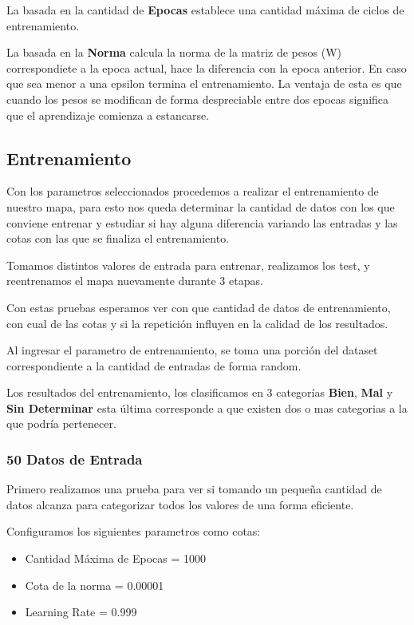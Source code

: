 La basada en la cantidad de \textbf{Epocas} establece una cantidad máxima de
ciclos de entrenamiento.

La basada en la \textbf{Norma} calcula la norma de la matriz de pesos (W) 
correspondiete a la epoca actual, hace la diferencia con la epoca anterior.
En caso que sea menor a una epsilon termina el entrenamiento. La ventaja
de esta es que cuando los pesos se modifican de forma despreciable entre
dos epocas significa que el aprendizaje comienza a estancarse.


\subsection{Entrenamiento}

Con los parametros seleccionados procedemos a realizar el entrenamiento de
nuestro mapa, para esto nos queda determinar la cantidad de datos con los que
conviene entrenar y estudiar si hay alguna diferencia variando las entradas
y las cotas con las que se finaliza el entrenamiento.

Tomamos distintos valores de entrada para entrenar, realizamos los test, y
reentrenamos el mapa nuevamente durante 3 etapas.

Con estas pruebas esperamos ver con que cantidad de datos de entrenamiento, 
con cual de las cotas y si la repetición influyen en la calidad de los resultados.

Al ingresar el parametro de entrenamiento, se toma una porción del dataset correspondiente
a la cantidad de entradas de forma random.

Los resultados del entrenamiento, los clasificamos en 3 categorías \textbf{Bien}, \textbf{Mal}
y \textbf{Sin Determinar} esta última corresponde a que existen dos o mas categorias a la que
podría pertenecer.



\subsubsection{50 Datos de Entrada}

Primero realizamos una prueba para ver si tomando un pequeña cantidad de datos alcanza para
categorizar todos los valores de una forma eficiente.

Configuramos los siguientes parametros como cotas:

\begin{itemize}
	\item Cantidad Máxima de Epocas = 1000
	\item Cota de la norma = 0.00001
	\item Learning Rate = 0.999
\end{itemize}



